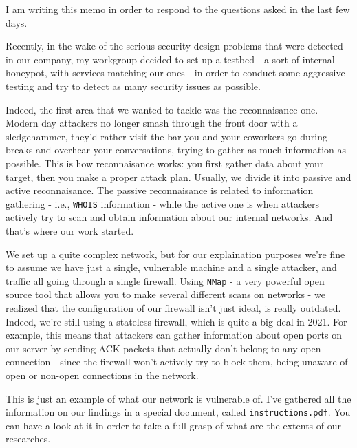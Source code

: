 \documentclass[paper=a4]{../../_global/texMemo}
\begin{document}
\maketitle

I am writing this memo in order to respond to the questions asked in the last few days.

Recently, in the wake of the serious security design problems that were detected in our company, my workgroup decided to set up a testbed - a sort of internal honeypot, with services matching our ones - in order to conduct some aggressive testing and try to detect as many security issues as possible.

Indeed, the first area that we wanted to tackle was the reconnaisance one. Modern day attackers no longer smash through the front door with a sledgehammer, they'd rather visit the bar you and your coworkers go during breaks and overhear your conversations, trying to gather as much information as possible. This is how reconnaisance works: you first gather data about your target, then you make a proper attack plan. Usually, we divide it into passive and active reconnaisance. The passive reconnaisance is related to information gathering - i.e., \verb=WHOIS= information - while the active one is when attackers actively try to scan and obtain information about our internal networks. And that's where our work started.

We set up a quite complex network, but for our explaination purposes we're fine to assume we have just a single, vulnerable machine and a single attacker, and traffic all going through a single firewall. Using \verb=NMap= - a very powerful open source tool that allows you to make several different scans on networks - we realized that the configuration of our firewall isn't just ideal, is really outdated. Indeed, we're still using a stateless firewall, which is quite a big deal in 2021. For example, this means that attackers can gather information about open ports on our server by sending ACK packets that actually don't belong to any open connection - since the firewall won't actively try to block them, being unaware of open or non-open connections in the network.

This is just an example of what our network is vulnerable of. I've gathered all the information on our findings in a special document, called \verb=instructions.pdf=. You can have a look at it in order to take a full grasp of what are the extents of our researches.
\end{document}
